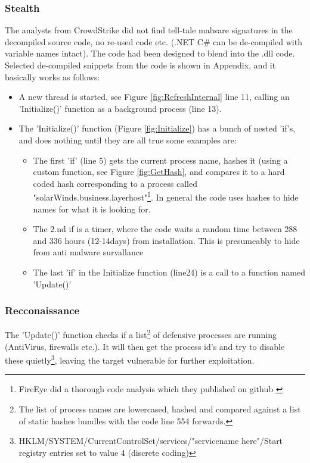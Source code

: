 \documentclass[
	letterpaper, %
	10pt, %
	unnumberedsections, %
	twoside, %
]{LTJournalArticle}
\begin{document}
\subsubsection{Stealth}
The analysts from CrowdStrike did not find tell-tale malware signatures in the decompiled source code, no re-used code etc. (.NET C\# can be de-compiled with variable names intact). The code had been designed to blend into the .dll code. Selected de-compiled snippets from the code is shown in Appendix, and it basically works as follows:

\begin{itemize}
\item{A new thread is started, see Figure \ref{fig:RefreshInternal} line 11, calling an 'Initialize()' function as a background process (line 13).} 
\item
	The 'Initialize()' function (Figure \ref{fig:Initialize}) has a bunch of nested 'if's, and does nothing until they are all true some examples are: 
	\begin{itemize}
		\item The first 'if' (line 5) gets the current process name, hashes it (using a custom function, see Figure \ref{fig:GetHash}, and compares it to a hard coded hash corresponding to a process called "solarWinds.business.layerhost"\footnote{FireEye did a thorough code analysis which they published on github \cite{FireEyeGithub}}. In general the code uses hashes to hide names for what it is looking for.
		\item{The 2.nd if is a timer, where the code waits a random time between 288 and 336 hours (12-14days) from installation. This is presumeably to hide from anti malware survallance}
		\item  The last 'if' in the Initialize function (line24) is a call to a function named 'Update()'
\end{itemize}

\end{itemize}



\subsubsection{Recconaissance}

The 'Update()' function checks if a list\footnote{The list of process names are lowercased, hashed and compared against a list of static hashes bundles with the code\cite{SolarWindsOrionCoreBusinessLayerdll} line 554 forwards.} of defensive processes are running (AntiVirus, firewalls etc.). It will then get the process id's and try to disable these quietly\footnote{HKLM/SYSTEM/CurrentControlSet/services/"servicename here"/Start registry entries set to value 4 (discrete coding)}, leaving the target vulnerable for further exploitation. 
\end{document}
